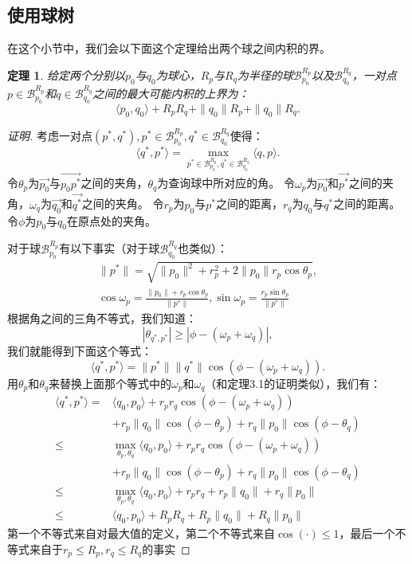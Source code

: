 \documentclass[twocolumn,a4paper]{article}
\begin{document}
\subsection{使用球树}
在这个小节中，我们会以下面这个定理给出两个球之间内积的界。
\newtheorem{theorem2}{定理}[section]
\begin{theorem2}
给定两个分别以$p_0$与$q_0$为球心，$R_p$与$R_q$为半径的球$\mathcal{B}_{p_0}^{R_p}$以及$\mathcal{B}_{q_0}^{R_q}$，一对点$p\in\mathcal{B}_{p_0}^{R_p}$和$q\in\mathcal{B}_{q_0}^{R_q}$之间的最大可能内积的上界为：
\begin{equation}
\langle p_0,q_0 \rangle + R_p R_q + \|q_0\|R_p + \|q_0\|R_q.
\end{equation}
\end{theorem2}
\begin{proof}[证明]
考虑一对点$(p^*,q^*),p^*\in\mathcal{B}_{p_0}^{R_p},q^*\in\mathcal{B}_{q_0}^{R_q}$使得：
\begin{equation}
\langle q^*,p^* \rangle = \max_{p^*\in\mathcal{B}_{p_0}^{R_p},q^*\in\mathcal{B}_{q_0}^{R_q}} \langle q,p \rangle.
\end{equation}
令$\theta_p$为$\vec{p_0}$与$\vec{p_0 p^*}$之间的夹角，$\theta_q$为查询球中所对应的角。
令$\omega_p$为$\vec{p_0}$和$\vec{p^*}$之间的夹角，$\omega_q$为$\vec{q_0}$和$\vec{q^*}$之间的夹角。
令$r_p$为$p_0$与$p^*$之间的距离，$r_q$为$q_0$与$q^*$之间的距离。
令$\phi$为$p_0$与$q_0$在原点处的夹角。

对于球$\mathcal{B}_{p_0}^{R_p}$有以下事实（对于球$\mathcal{B}_{q_0}^{R_q}$也类似）：
\begin{gather*}
\|p^*\| = \sqrt{\|p_0\|^2+r_p^2+2\|p_0\|r_p\cos\theta_p}, \\
\cos\omega_p = \frac{\|p_0\|+r_p\cos\theta_p}{\|p^*\|},\sin\omega_p = \frac{r_p\sin\theta_p}{\|p^*\|}
\end{gather*}
根据角之间的三角不等式，我们知道：
\begin{equation*}
|\theta_{q^*,p^*}| \ge |\phi - (\omega_p + \omega_q)|,
\end{equation*}
我们就能得到下面这个等式：
\begin{equation}
\langle q^*,p^* \rangle = \|p^*\|\|q^*\|\cos(\phi-(\omega_p+\omega_q)).
\end{equation}
用$\theta_p$和$\theta_q$来替换上面那个等式中的$\omega_p$和$\omega_q$（和定理3.1的证明类似），我们有：
\begin{align*}
\langle q^*,p^* \rangle =
    & \langle q_0,p_0 \rangle + r_p r_q\cos(\phi-(\omega_p+\omega_q)) \\
    & + r_p\|q_0\|\cos(\phi-\theta_p)+r_q\|p_0\|\cos(\phi-\theta_q) \\
\le & \max_{\theta_p,\theta_q}\langle q_0,p_0 \rangle + r_p r_q\cos(\phi-(\omega_p+\omega_q)) \\
    & + r_p\|q_0\|\cos(\phi-\theta_p)+r_q\|p_0\|\cos(\phi-\theta_q) \\
\le & \max_{\theta_p,\theta_q}\langle q_0,p_0 \rangle + r_p r_q + r_p\|q_0\| + r_q\|p_0\| \\
\le & \langle q_0,p_0 \rangle + R_p R_q + R_p\|q_0\| + R_q\|p_0\|
\end{align*}
第一个不等式来自对最大值的定义，第二个不等式来自$\cos(\cdot)\le1$，最后一个不等式来自于$r_p \le R_p, r_q \le R_q$的事实
\end{proof}
\end{document}
